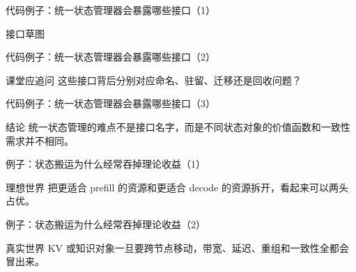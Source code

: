 \begin{frame}{代码例子：统一状态管理器会暴露哪些接口（1）}
\begin{block}{接口草图}
    {\ttfamily\small
    \par
    \par
    \par
    }
  \end{block}
\end{frame}

\begin{frame}{代码例子：统一状态管理器会暴露哪些接口（2）}
\begin{block}{课堂应追问}
    这些接口背后分别对应命名、驻留、迁移还是回收问题？
  \end{block}
\end{frame}

\begin{frame}{代码例子：统一状态管理器会暴露哪些接口（3）}
\begin{block}{结论}
    统一状态管理的难点不是接口名字，而是不同状态对象的价值函数和一致性需求并不相同。
  \end{block}
\end{frame}

\begin{frame}{例子：状态搬运为什么经常吞掉理论收益（1）}
\begin{block}{理想世界}
    把更适合 prefill 的资源和更适合 decode 的资源拆开，看起来可以两头占优。
  \end{block}
\end{frame}

\begin{frame}{例子：状态搬运为什么经常吞掉理论收益（2）}
\begin{block}{真实世界}
    KV 或知识对象一旦要跨节点移动，带宽、延迟、重组和一致性全都会冒出来。
  \end{block}
\end{frame}

